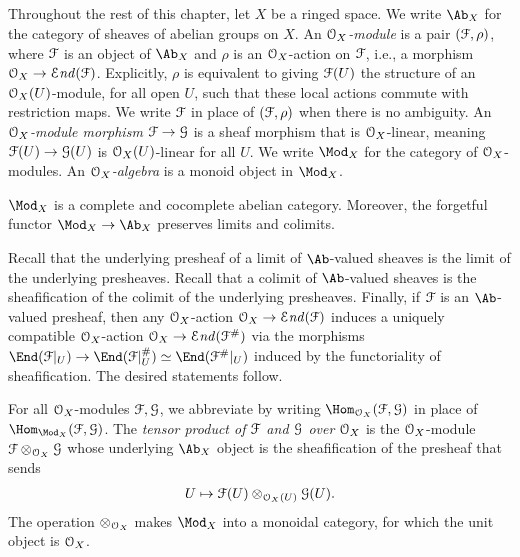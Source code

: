 \documentclass[10pt,final,oneside]{amsbook}
\makeatletter
\renewenvironment{proof}[1][\proofname] 
{ 	
	\par\pushQED{\qed}\normalfont\topsep6\p@\@plus6\p@\relax\trivlist\itemindent\normalparindent
	\item[\hskip\labelsep\itshape#1\@addpunct{.}]\ignorespaces
}
{
	\popQED\endtrivlist\@endpefalse
}
\numberwithin{equation}{section}
\newcommand{\SEnd}{{\mathcal{E}\mathit{nd}}}
\makeatother
\begin{document}
\subsection{}

Throughout the rest of this chapter, let $X$ be a ringed space.
We write $\Ab_X$ for the category of sheaves of abelian groups on $X$.
An \emph{$\cal{O}_X$-module} is a pair $(\cal{F}, \rho)$, where $\cal{F}$ is an object of $\Ab_X$ and $\rho$ is an $\cal{O}_X$-action on $\cal{F}$, i.e., a morphism $\cal{O}_X \to \SEnd(\cal{F})$.
Explicitly, $\rho$ is equivalent to giving $\cal{F}(U)$ the structure of an $\cal{O}_X(U)$-module, for all open $U$, such that these local actions commute with restriction maps.
We write $\cal{F}$ in place of $(\cal{F}, \rho)$ when there is no ambiguity.
An \emph{$\cal{O}_X$-module morphism $\cal{F} \to \cal{G}$} is a sheaf morphism that is $\cal{O}_X$-linear, meaning $\cal{F}(U) \to \cal{G}(U)$ is $\cal{O}_X(U)$-linear for all $U$.
We write $\Mod_X$ for the category of $\cal{O}_X$-modules.
An \emph{$\cal{O}_X$-algebra} is a monoid object in $\Mod_X$.

\begin{prop}
$\Mod_X$ is a complete and cocomplete abelian category.
Moreover, the forgetful functor $\Mod_X \to \Ab_X$ preserves limits and colimits.
\end{prop}

\begin{proof}
Recall that the underlying presheaf of a limit of $\Ab$-valued sheaves is the limit of the underlying presheaves.
Recall that a colimit of $\Ab$-valued sheaves is the sheafification of the colimit of the underlying presheaves.
Finally, if $\cal{F}$ is an $\Ab$-valued presheaf, then any $\cal{O}_X$-action $\cal{O}_X \to \SEnd(\cal{F})$ induces a uniquely compatible $\cal{O}_X$-action $\cal{O}_X \to \SEnd(\cal{F}^\#)$ via the morphisms $\End(\cal{F}|_U) \to \End(\cal{F}|_U^\#) \simeq \End(\cal{F}^\#|_U)$ induced by the functoriality of sheafification.
The desired statements follow.
\end{proof}

For all $\cal{O}_X$-modules $\cal{F}, \cal{G}$, we abbreviate by writing $\Hom_{\cal{O}_X}(\cal{F}, \cal{G})$ in place of $\Hom_{\Mod_X}(\cal{F}, \cal{G})$.
The \emph{tensor product of $\cal{F}$ and $\cal{G}$ over $\cal{O}_X$} is the $\cal{O}_X$-module $\cal{F} \otimes_{\cal{O}_X} \cal{G}$ whose underlying $\Ab_X$ object is the sheafification of the presheaf that sends 
\begin{align}
U \mapsto \cal{F}(U) \otimes_{\cal{O}_X(U)} \cal{G}(U).
\end{align}
The operation $\otimes_{\cal{O}_X}$ makes $\Mod_X$ into a monoidal category, for which the unit object is $\cal{O}_X$.
\end{document}
